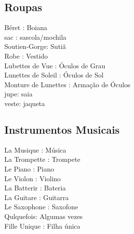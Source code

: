 \documentclass{article}
\begin{document}
    \subsection{Roupas}
                                   Béret        : Boiana\\
                                   sac          : sascola/mochila\\
                                   Soutien-Gorge: Sutiã\\
                                   Robe         : Vestido\\
                          Lubettes de Vue       : Óculos de Grau\\
                          Lunettes de Soleil    : Óculos de Sol\\
                          Monture  de Lunettes  : Armação de Óculos\\
                          jupe: saia\\
                          veste: jaqueta\\
    
    \subsection{Instrumentos Musicais}
        La    Musique   : Música\\
        La    Trompette : Trompete\\
        Le    Piano     : Piano\\
        Le    Violon    : Violino\\
        La    Batterir  : Bateria\\
        La    Guitare   : Guitarra\\
        Le    Saxophone : Saxofone\\
              Qulquefois: Algumas vezes\\
        Fille Unique    : Filha única\\
        
\end{document}
